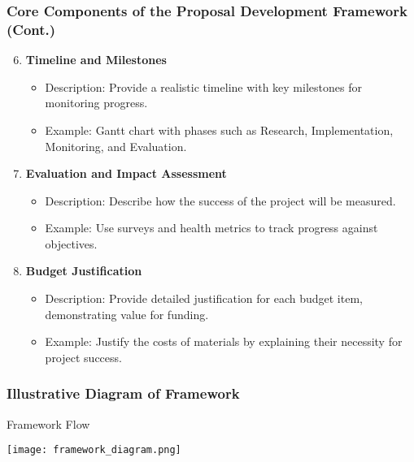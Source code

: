 \documentclass[aspectratio=169]{beamer}
\begin{document}
\begin{frame}[fragile]
    \frametitle{Core Components of the Proposal Development Framework (Cont.)}
    \begin{enumerate}
        \setcounter{enumi}{5}
        \item \textbf{Timeline and Milestones}
        \begin{itemize}
            \item Description: Provide a realistic timeline with key milestones for monitoring progress.
            \item Example: Gantt chart with phases such as Research, Implementation, Monitoring, and Evaluation.
        \end{itemize}

        \item \textbf{Evaluation and Impact Assessment}
        \begin{itemize}
            \item Description: Describe how the success of the project will be measured.
            \item Example: Use surveys and health metrics to track progress against objectives.
        \end{itemize}

        \item \textbf{Budget Justification}
        \begin{itemize}
            \item Description: Provide detailed justification for each budget item, demonstrating value for funding.
            \item Example: Justify the costs of materials by explaining their necessity for project success.
        \end{itemize}
    \end{enumerate}
\end{frame}

\begin{frame}[fragile]
    \frametitle{Illustrative Diagram of Framework}
    \begin{block}{Framework Flow}
        \begin{center}
        \texttt{[image: framework\_diagram.png]} %
        \end{center}
    \end{block}
\end{frame}
\end{document}
